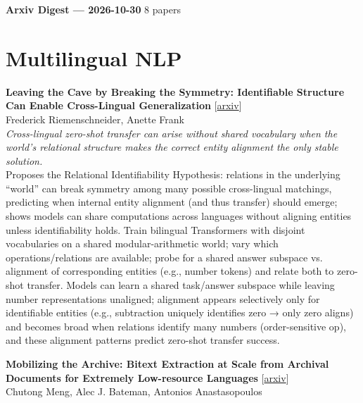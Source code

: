 \documentclass[12pt,letterpaper]{article}
\begin{document}
{\footnotesize\textbf{Arxiv Digest --- 2026-10-30} \hfill 8 papers}

\smallskip

\section*{Multilingual NLP}

{\small\textbf{Leaving the Cave by Breaking the Symmetry: Identifiable Structure Can Enable Cross-Lingual Generalization}} {\scriptsize[\href{https://arxiv.org/abs/2610.38509}{arxiv}]}\\
{\scriptsize Frederick Riemenschneider, Anette Frank}\\

{\small\textit{Cross-lingual zero-shot transfer can arise without shared vocabulary when the world's relational structure makes the correct entity alignment the only stable solution.}}\\[1pt]
{\footnotesize Proposes the Relational Identifiability Hypothesis: relations in the underlying ``world'' can break symmetry among many possible cross-lingual matchings, predicting when internal entity alignment (and thus transfer) should emerge; shows models can share computations across languages without aligning entities unless identifiability holds. Train bilingual Transformers with disjoint vocabularies on a shared modular-arithmetic world; vary which operations/relations are available; probe for a shared answer subspace vs. alignment of corresponding entities (e.g., number tokens) and relate both to zero-shot transfer. Models can learn a shared task/answer subspace while leaving number representations unaligned; alignment appears selectively only for identifiable entities (e.g., subtraction uniquely identifies zero → only zero aligns) and becomes broad when relations identify many numbers (order-sensitive op), and these alignment patterns predict zero-shot transfer success.}

\medskip

{\small\textbf{Mobilizing the Archive: Bitext Extraction at Scale from Archival Documents for Extremely Low-resource Languages}} {\scriptsize[\href{https://arxiv.org/abs/2610.40233}{arxiv}]}\\
{\scriptsize Chutong Meng, Alec J. Bateman, Antonios Anastasopoulos}\\
\end{document}
